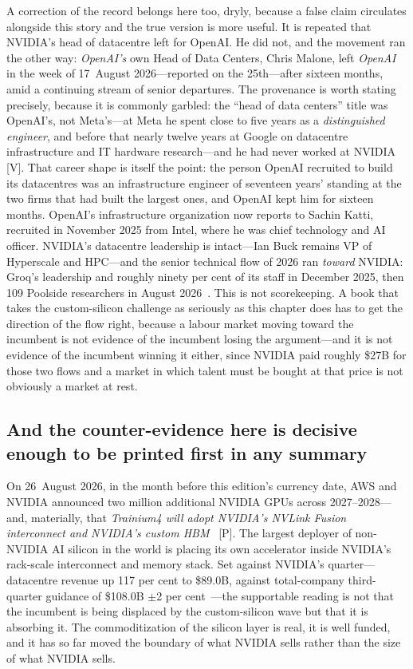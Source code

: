 A correction of the record belongs here too, dryly, because a false claim circulates alongside this story and the true version is more useful. It is repeated that NVIDIA's head of datacentre left for OpenAI. He did not, and the movement ran the other way: \emph{OpenAI's} own Head of Data Centers, Chris Malone, left \emph{OpenAI} in the week of 17~August 2026---reported on the 25th---after sixteen months, amid a continuing stream of senior departures. The provenance is worth stating precisely, because it is commonly garbled: the ``head of data centers'' title was OpenAI's, not Meta's---at Meta he spent close to five years as a \emph{distinguished engineer}, and before that nearly twelve years at Google on datacentre infrastructure and IT hardware research---and he had never worked at NVIDIA~\cite{openai-exec} [V]. That career shape is itself the point: the person OpenAI recruited to build its datacentres was an infrastructure engineer of seventeen years' standing at the two firms that had built the largest ones, and OpenAI kept him for sixteen months. OpenAI's infrastructure organization now reports to Sachin Katti, recruited in November 2025 from Intel, where he was chief technology and AI officer. NVIDIA's datacentre leadership is intact---Ian Buck remains VP of Hyperscale and HPC---and the senior technical flow of 2026 ran \emph{toward} NVIDIA: Groq's leadership and roughly ninety per cent of its staff in December 2025, then 109 Poolside researchers in August 2026~\cite{nvda-structured,nvda-poolside}. This is not scorekeeping. A book that takes the custom-silicon challenge as seriously as this chapter does has to get the direction of the flow right, because a labour market moving toward the incumbent is not evidence of the incumbent losing the argument---and it is not evidence of the incumbent winning it either, since NVIDIA paid roughly \$27B for those two flows and a market in which talent must be bought at that price is not obviously a market at rest.

\subsection{And the counter-evidence here is decisive enough to be printed first in any summary}

On 26~August 2026, in the month before this edition's currency date, AWS and NVIDIA announced two million additional NVIDIA GPUs across 2027--2028---and, materially, that \emph{Trainium4 will adopt NVIDIA's NVLink Fusion interconnect and NVIDIA's custom HBM}~\cite{aws-nvda} [P]. The largest deployer of non-NVIDIA AI silicon in the world is placing its own accelerator inside NVIDIA's rack-scale interconnect and memory stack. Set against NVIDIA's quarter---datacentre revenue up 117 per cent to \$89.0B, against total-company third-quarter guidance of \$108.0B $\pm$2 per cent~\cite{nvda-q2fy27}---the supportable reading is not that the incumbent is being displaced by the custom-silicon wave but that it is absorbing it. The commoditization of the silicon layer is real, it is well funded, and it has so far moved the boundary of what NVIDIA sells rather than the size of what NVIDIA sells.


